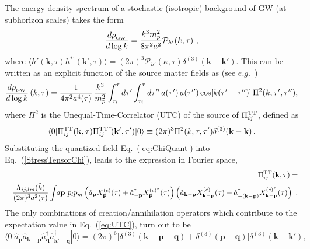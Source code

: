 \documentclass[a4paper,11pt]{article}
\newcommand{\be}{\begin{equation}}
\newcommand{\ee}{\end{equation}}
\newcommand{\bk}{{\mathbf k}}
\newcommand{\GW}{{_{\rm GW}}}
\begin{document}
The energy density spectrum of a stochastic (isotropic) background of GW (at subhorizon scales) takes the form
\be \frac{d \rho_{_{\rm GW}}}{d \log k } = \frac{k^3 m_p^2}{8 \pi^2 a^2} \mathcal{P}_{h'}(k,\tau) \label{eq:ThetaGW} \ , \ee
where $\langle h'(\mathbf{k},\tau) h^{*'}(\mathbf{k'},\tau)\rangle = (2 \pi)^3 \mathcal{P}_{h'} (\kappa,\tau) \delta^{(3)} (\mathbf{k} - \mathbf{k'})$. This can be written as an explicit function of the source matter fields as (see $e.g.$~\cite{Figueroa:2012kw}) 
\begin{equation}\label{eq:GW_spectra(Pi)}
\frac{d\rho_{\mathrm{\GW}}}{d\log k}\left(k,\tau\right) =  \frac{1}{4\pi^2a^4(\tau)}\,{k^3\over m_p^2}\int_{\tau_{i}}^{\tau}d\tau'\int_{\tau_{i}}^{\tau}d\tau''\,a(\tau')\,a(\tau'')\cos[k(\tau'-\tau'')]\,\Pi^2(k,\tau',\tau''),
\end{equation}
where $\Pi^2$ is the Unequal-Time-Correlator (UTC) of the source of $\Pi_{ij}^{\rm TT}$, defined as 
\begin{eqnarray}\label{eq:UTC}
\langle \text{0}| \Pi_{ij}^{{\rm TT}}(\mathbf{k},\tau)\Pi_{ij}^{{\rm TT}^{\hspace*{0.2mm}*}}\hspace*{-0.7mm}(\mathbf{k'},\tau') |0\rangle \equiv (2\pi)^3 \Pi^2(k,\tau,\tau') \delta^{(3)}(\bk-\bk)\,.
\end{eqnarray}
Substituting the quantized field Eq.~(\ref{eq:ChiQuant}) into Eq.~(\ref{StressTensorChi}), leads to the expression in Fourier space,
\begin{eqnarray}
&& \Pi_{ij}^{{\rm TT}}(\mathbf{k},\tau) = \\ 
&& {\Lambda_{ij,lm}(\hat{k})\over (2\pi)^{3}a^2(\tau)}\int\hspace*{-0.1cm}d\mathbf{p}~p_{l}p_{m}\left(\hat{a}_{\mathbf{p}}X^{(c)}_{\mathbf{p}}(\tau)+\hat{a}_{-\mathbf{p}}^{\dagger}{X^{(c)^{*}}_{\mathbf{p}}}(\tau)\right)\left(\hat{a}_{\mathbf{k-p}}X^{(c)}_{\mathbf{k-p}}(\tau)+\hat{a}_{-\mathbf{\left(k-p\right)}}^{\dagger}{X^{(c)^{*}}_{\mathbf{k-p}}}(\tau)\right) \ . \nonumber
\end{eqnarray}
The only combinations of creation/annihilation operators which contribute to the expectation value in Eq.~(\ref{eq:UTC}), turn out to be
\begin{equation}\label{eq:survivingCombinationBosons}
	\langle \text{0} |\hat{a}_{\mathbf{p}}\hat{a}_{\mathbf{k-p}}\hat{a}_{\mathbf{q}}^{\dagger}\hat{a}_{\mathbf{k'-q}}^{\dagger} |0\rangle =\left(2\pi\right)^{6}\big[\delta^{(3)}(\mathbf{k-p-q}) +\delta^{(3)}(\mathbf{p-q})\big]\delta^{(3)}(\mathbf{k-k'}),
\end{equation}
\end{document}
